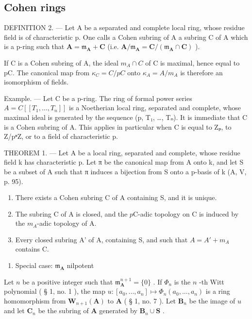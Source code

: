 \subsection{Cohen rings}

DEFINITION 2. --- Let A be a separated and complete local ring, whose residue field is of characteristic p. One calls a Cohen subring of A a subring C of A which is a p-ring such that \(\mathbf{A} = \mathfrak{m}_{\mathbf{A}} + \mathbf{C}\) (i.e. \(\mathbf{A}/\mathfrak{m}_{\mathbf{A}} = \mathbf{C}/(\mathfrak{m}_{\mathbf{A}} \cap \mathbf{C})\) ).

If C is a Cohen subring of A, the ideal \(m_{A} \cap C\) of C is maximal, hence equal to pC. The canonical map from \(\kappa_{C} = C/pC\) onto \(\kappa_{A} = A/m_{A}\) is therefore an isomorphism of fields.

Example. --- Let C be a p-ring. The ring of formal power series \(A = C[[T_{1}, \ldots, T_{n}]]\) is a Noetherian local ring, separated and complete, whose maximal ideal is generated by the sequence (p, T₁, \ldots, Tₙ). It is immediate that C is a Cohen subring of A. This applies in particular when C is equal to Zₚ, to Z/pⁿZ, or to a field of characteristic p.

THEOREM 1. — Let A be a local ring, separated and complete, whose residue field k has characteristic p. Let π be the canonical map from A onto k, and let S be a subset of A such that π induces a bijection from S onto a p-basis of k (A, V, p. 95).

\begin{enumerate}
\def\labelenumi{\alph{enumi})}
\item
  There exists a Cohen subring C of A containing S, and it is unique.
\item
  The subring C of A is closed, and the \(p\)C-adic topology on C is induced by the \(m_{A}\)-adic topology of A.
\item
  Every closed subring A' of A, containing S, and such that \(A = A' + m_{A}\) contains C.
\end{enumerate}

\begin{enumerate}
\def\labelenumi{\Alph{enumi})}
\tightlist
\item
  Special case: \(\mathfrak{m}_{\mathbf{A}}\) nilpotent
\end{enumerate}

Let \(n\) be a positive integer such that \(\mathfrak{m}_{\mathbf{A}}^{n+1}=\{0\}\) . If \(\Phi_{n}\) is the \(n\) -th Witt polynomial ( § 1, no. 1 ), the map \(u:[a_{0},..., a_{n}]\mapsto\Phi_{n}(a_{0},..., a_{n})\) is a ring homomorphism from \(\mathbf{W}_{n+1}(\mathbf{A})\) to \(\mathbf{A}\) ( § 1, no. 7 ). Let \(\mathbf{B}_{n}\) be the image of \(u\) and let \(\mathbf{C}_{n}\) be the subring of \(\mathbf{A}\) generated by \(\mathbf{B}_{n}\cup\mathbf{S}\) .

